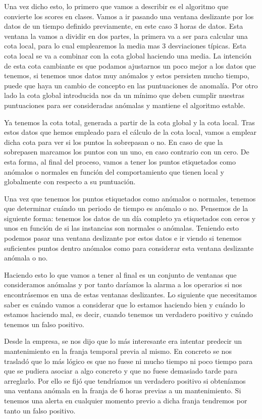 Una vez dicho esto, lo primero que vamos a describir es el algoritmo que convierte los scores en clases. Vamos a ir pasando una ventana deslizante por los datos de un tiempo definido previamente, en este caso 3 horas de datos. Esta ventana la vamos a dividir en dos partes, la primera va a ser para calcular una cota local, para lo cual emplearemos la media mas 3 desviaciones típicas. Esta cota local se va a combinar con la cota global haciendo una media. La intención de esta cota cambiante es que podamos ajustarnos un poco mejor a los datos que tenemos, si tenemos unos datos muy anómalos y estos persisten mucho tiempo, puede que haya un cambio de concepto en las puntuaciones de anomalía. Por otro lado la cota global introducida nos da un mínimo que deben cumplir nuestras puntuaciones para ser consideradas anómalas y mantiene el algoritmo estable.

Ya tenemos la cota total, generada a partir de la cota global y la cota local. Tras estos datos que hemos empleado para el cálculo de la cota local, vamos a emplear dicha cota para ver si los puntos la sobrepasan o no. En caso de que la sobrepasen marcamos los puntos con un uno, en caso contrario con un cero. De esta forma, al final del proceso, vamos a tener los puntos etiquetados como anómalos o normales en función del comportamiento que tienen local y globalmente con respecto a su puntuación.

Una vez que tenemos los puntos etiquetados como anómalos o normales, tenemos que determinar cuándo un periodo de tiempo es anómalo o no. Pensemos de la siguiente forma: tenemos los datos de un día completo ya etiquetados con ceros y unos en función de si las instancias son normales o anómalas. Teniendo esto podemos pasar una ventana deslizante por estos datos e ir viendo si tenemos suficientes puntos dentro anómalos como para considerar esta ventana deslizante anómala o no. 

Haciendo esto lo que vamos a tener al final es un conjunto de ventanas que consideramos anómalas y por tanto daríamos la alarma a los operarios si nos encontrásemos en una de estas ventanas deslizantes. Lo siguiente que necesitamos saber es cuándo vamos a considerar que lo estamos haciendo bien y cuándo lo estamos haciendo mal, es decir, cuando tenemos un verdadero positivo y cuándo tenemos un falso positivo. 

Desde la empresa, se nos dijo que lo más interesante era intentar predecir un mantenimiento en la franja temporal previa al mismo. En concreto se nos trasladó que lo más lógico es que no fuese ni mucho tiempo ni poco tiempo para que se pudiera asociar a algo concreto y que no fuese demasiado tarde para arreglarlo. Por ello se fijó que tendríamos un verdadero positivo si obteníamos una ventana anómala en la franja de 6 horas previas a un mantenimiento. Si tenemos una alerta en cualquier momento previo a dicha franja tendremos por tanto un falso positivo.

